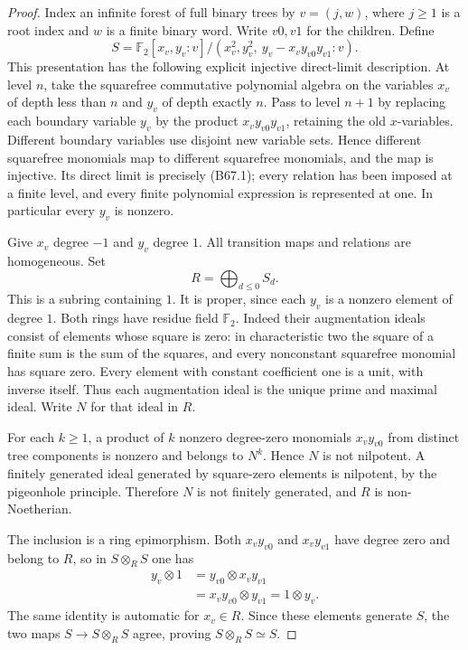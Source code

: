 \begin{proof}
Index an infinite forest of full binary trees by
$v=(j,w)$, where $j\ge1$ is a root index and
$w$ is a finite binary word. Write $v0,v1$ for
the children. Define
\[
 S=\mathbb F_2[x_v,y_v:v]/
       (x_v^2,y_v^2,\ y_v-x_vy_{v0}y_{v1}:v).             \tag{B67.1}
\]
This presentation has the following explicit
injective direct-limit description. At level
$n$, take the squarefree commutative polynomial
algebra on the variables $x_v$ of depth less
than $n$ and $y_v$ of depth exactly $n$.
Pass to level $n+1$ by replacing each boundary
variable $y_v$ by the product
$x_vy_{v0}y_{v1}$, retaining the old $x$-variables.
Different boundary variables use disjoint new
variable sets. Hence different squarefree
monomials map to different squarefree monomials,
and the map is injective. Its direct limit is
precisely (B67.1); every relation has been
imposed at a finite level, and every finite
polynomial expression is represented at one.
In particular every $y_v$ is nonzero.

Give $x_v$ degree $-1$ and $y_v$ degree $1$.
All transition maps and relations are homogeneous.
Set
\[
                         R=\bigoplus_{d\le0}S_d.          \tag{B67.2}
\]
This is a subring containing $1$. It is proper,
since each $y_v$ is a nonzero element of degree
$1$. Both rings have residue field $\mathbb F_2$.
Indeed their augmentation ideals consist of
elements whose square is zero: in characteristic
two the square of a finite sum is the sum of
the squares, and every nonconstant squarefree
monomial has square zero. Every element with
constant coefficient one is a unit, with
inverse itself. Thus each augmentation ideal
is the unique prime and maximal ideal.
Write $N$ for that ideal in $R$.

For each $k\ge1$, a product of $k$ nonzero
degree-zero monomials $x_vy_{v0}$ from distinct
tree components is nonzero and belongs to
$N^k$. Hence $N$ is not nilpotent. A finitely
generated ideal generated by square-zero
elements is nilpotent, by the pigeonhole
principle. Therefore $N$ is not finitely
generated, and $R$ is non-Noetherian.

The inclusion is a ring epimorphism. Both
$x_vy_{v0}$ and $x_vy_{v1}$ have degree zero
and belong to $R$, so in $S\otimes_R S$ one has
\[
\begin{aligned}
 y_v\otimes1
 &=y_{v0}\otimes x_vy_{v1}\\
 &=x_vy_{v0}\otimes y_{v1}
 =1\otimes y_v.
\end{aligned}                                             \tag{B67.3}
\]
\]
The same identity is automatic for $x_v\in R$.
Since these elements generate $S$, the two
maps $S\to S\otimes_R S$ agree, proving
$S\otimes_R S\simeq S$.


\end{proof}

